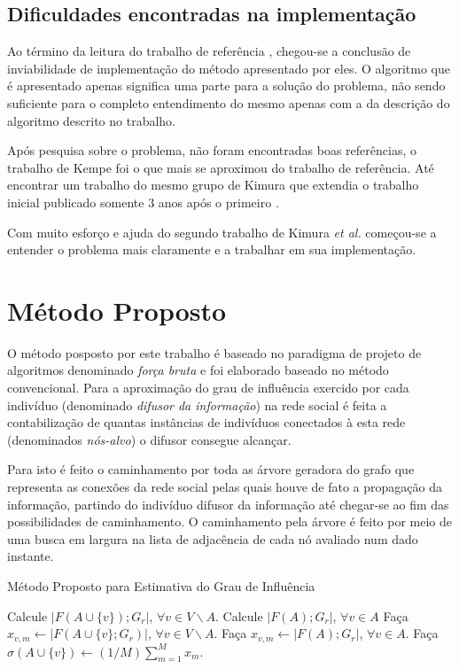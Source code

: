 \documentclass{acm_proc_article-sp}
\begin{document}
\subsection{Dificuldades encontradas na implementação}
Ao término da leitura do trabalho de referência \cite{kimura:2007}, chegou-se a conclusão de inviabilidade de
implementação do método apresentado por eles. O algoritmo que é apresentado apenas significa uma parte para a
solução do problema, não sendo suficiente para o completo entendimento do mesmo apenas com a da descrição do
algoritmo descrito no trabalho.

Após pesquisa sobre o problema, não foram encontradas boas referências, o trabalho de Kempe\cite{kempe:2003} foi o
que mais se aproximou do trabalho de referência. Até encontrar um trabalho do mesmo grupo de Kimura que extendia o
trabalho inicial publicado somente 3 anos após o primeiro \cite{kimura:2010}.

Com muito esforço e ajuda do segundo trabalho de Kimura \textit{et al.} começou-se a entender o problema mais
claramente e a trabalhar em sua implementação. 

\section{Método Proposto}
O método posposto por este trabalho é baseado no paradigma de projeto de algoritmos denominado \textit{força
bruta} e foi elaborado baseado no método convencional. Para a aproximação do grau de influência exercido
por cada indivíduo (denominado \textit{difusor da informação}) na rede social é feita a contabilização de quantas 
instâncias de indivíduos conectados à esta rede (denominados \textit{nós-alvo}) o difusor consegue alcançar. 

Para isto é feito o caminhamento por toda as árvore geradora do grafo que representa as conexões da rede social
pelas quais houve de fato a propagação da informação, partindo do indivíduo difusor da informação até chegar-se ao
fim das possibilidades de caminhamento. O caminhamento pela árvore é feito por meio de uma busca em largura na
lista de adjacência de cada nó avaliado num dado instante.

\begin{algorithm}[H]
\caption{Método Proposto para Estimativa do Grau de Influência}\label{metodoproposto}
\begin{algorithmic}[1]
		\State Calcule $|F(A \cup \{v\});G_{r}|$, $\forall v \in V \backslash A$.
		\State Calcule $|F(A);G_{r}|$, $\forall v \in A$ 		
		\State Faça $x_{v,m} \gets |F(A \cup \{v\};G_{r})|$,  $\forall v \in V \backslash A$.
		\State Faça $x_{v,m} \gets |F(A);G_{r}|$,  $\forall v \in A$. 
	\EndFor
	\State Faça $\sigma(A \cup \{v\}) \gets (1/M)\sum^{M}_{m=1} x_{m}$.
\EndProcedure
\end{algorithmic}
\end{algorithm}
\end{document}

